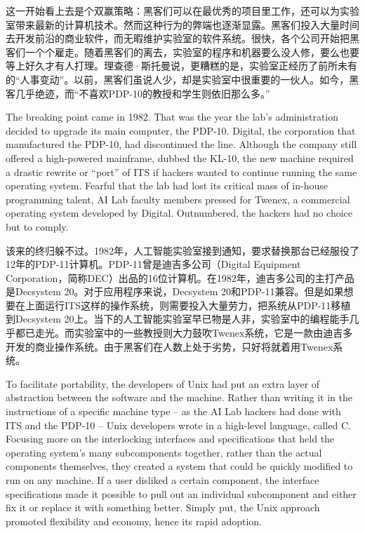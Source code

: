 \ifdefined\chs
这一开始看上去是个双赢策略：黑客们可以在最优秀的项目里工作，还可以为实验室带来最新的计算机技术。然而这种行为的弊端也逐渐显露。黑客们投入大量时间去开发前沿的商业软件，而无暇维护实验室的软件系统。很快，各个公司开始把黑客们一个个雇走。随着黑客们的离去，实验室的程序和机器要么没人修，要么也要等上好久才有人打理。理查德·斯托曼说，更糟糕的是，实验室正经历了前所未有的``人事变动''。以前，黑客们虽说人少，却是实验室中很重要的一伙人。如今，黑客几乎绝迹，而``不喜欢PDP-10的教授和学生则依旧那么多。''
\fi

\ifdefined\eng
The breaking point came in 1982. That was the year the lab's administration decided to upgrade its main computer, the PDP-10. Digital, the corporation that manufactured the PDP-10, had discontinued the line. Although the company still offered a high-powered mainframe, dubbed the KL-10, the new machine required a drastic rewrite or ``port'' of ITS if hackers wanted to continue running the same operating system. Fearful that the lab had lost its critical mass of in-house programming talent, AI Lab faculty members pressed for Twenex, a commercial operating system developed by Digital. Outnumbered, the hackers had no choice but to comply.
\fi

\ifdefined\chs
该来的终归躲不过。1982年，人工智能实验室接到通知，要求替换那台已经服役了12年的PDP-11计算机。PDP-11曾是迪吉多公司（Digital Equipment Corporation，简称DEC）出品的16位计算机。在1982年，迪吉多公司的主打产品是Decsystem 20。对于应用程序来说，Decsystem 20和PDP-11兼容。但是如果想要在上面运行ITS这样的操作系统，则需要投入大量劳力，把系统从PDP-11移植到Decsystem 20上。当下的人工智能实验室早已物是人非，实验室中的编程能手几乎都已走光。而实验室中的一些教授则大力鼓吹Twenex系统，它是一款由迪吉多开发的商业操作系统。由于黑客们在人数上处于劣势，只好将就着用Twenex系统。
\fi
\fi

\ifdefined\vtwo
\ifdefined\eng
To facilitate portability, the developers of Unix had put an extra layer of abstraction between the software and the machine. Rather than writing it in the instructions of a specific machine type -- as the AI Lab hackers had done with ITS and the PDP-10 -- Unix developers wrote in a high-level language, called C. Focusing more on the interlocking interfaces and specifications that held the operating system's many subcomponents together, rather than the actual components themselves, they created a system that could be quickly modified to run on any machine. If a user disliked a certain component, the interface specifications made it possible to pull out an individual subcomponent and either fix it or replace it with something better. Simply put, the Unix approach promoted flexibility and economy, hence its rapid adoption.
\fi

